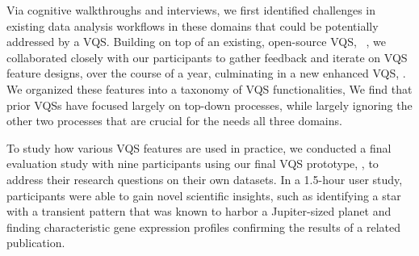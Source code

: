 \par Via cognitive walkthroughs and interviews, we first identified challenges in existing data analysis workflows in these domains
that could be potentially addressed by a VQS. Building on top of an existing, open-source VQS, \zv~\cite{Siddiqui2017,Siddiqui2017VLDB}, we collaborated closely with our participants to gather feedback and iterate on VQS feature designs,
over the course of a year, culminating in a new enhanced VQS, \zvpp. We organized these features into a taxonomy of VQS functionalities,  We find that prior VQSs have focused largely on top-down processes, while largely ignoring the other two processes that are crucial for the needs  all three domains.

\par 
To study how various VQS features 
are used in practice, 
we conducted a final evaluation study with nine participants 
using our final VQS prototype, \zvpp, 
to address their research questions 
on their own datasets. 
In a 1.5-hour user study, participants were able to 
gain novel scientific insights, 
such as identifying a star with a transient pattern 
that was known to harbor a Jupiter-sized planet 
and finding characteristic gene expression profiles confirming the results of a related publication.  

